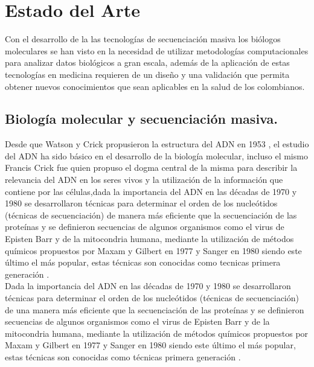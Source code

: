 \chapter{Estado del Arte}

Con el desarrollo de la las tecnologías de secuenciación masiva los biólogos moleculares se han visto en la necesidad  de utilizar metodologías computacionales para analizar datos biológicos a gran escala, además de la aplicación de estas tecnologías en medicina requieren de un diseño y una validación que permita obtener nuevos conocimientos que sean  aplicables en la salud de los colombianos.

\section{Biología molecular y secuenciación masiva.}

Desde  que  Watson y Crick propusieron la estructura del ADN en 1953 \cite{Watson1953}, el estudio del ADN ha sido básico en el desarrollo de la biología molecular, incluso el mismo Francis Crick fue quien propuso el dogma central de la misma para describir la relevancia del ADN en los seres vivos y la utilización de la información que contiene por las células,dada la importancia del  ADN  en las décadas de 1970 y 1980 se desarrollaron  técnicas para determinar el orden de los nucleótidos  (técnicas de secuenciación) de manera más eficiente que la secuenciación de las proteínas y se definieron secuencias de algunos organismos como el virus de Episten Barr y  de la mitocondria humana, mediante la utilización de métodos químicos propuestos por Maxam y Gilbert en 1977 y Sanger en 1980 siendo este último el más popular, estas técnicas son conocidas como tecnicas primera generación \cite{Herraez2012}. \\

Dada la importancia del  ADN  en las décadas de 1970 y 1980 se desarrollaron  técnicas para determinar el orden de los nucleótidos  (técnicas de secuenciación) de una manera más eficiente que la secuenciación de las proteínas y se definieron secuencias de algunos organismos como el virus de Episten Barr y  de la mitocondria humana, mediante la utilización de métodos químicos propuestos por Maxam y Gilbert en 1977 y Sanger en 1980 siendo este último el más popular, estas técnicas son conocidas como técnicas primera generación \cite{Herraez2012}. \\

